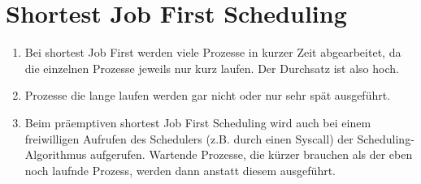 \documentclass[DIN, pagenumber=false, fontsize=11pt, parskip=half]{scrartcl}
\begin{document}
    \section{Shortest Job First Scheduling}
    \begin{enumerate}[label=(\alph*)]
        \item Bei shortest Job First werden viele Prozesse in kurzer Zeit abgearbeitet, da die einzelnen Prozesse jeweils nur kurz laufen. Der Durchsatz ist also hoch.
        \item Prozesse die lange laufen werden gar nicht oder nur sehr spät ausgeführt.
        \item Beim präemptiven shortest Job First Scheduling wird auch bei einem \glqq{}freiwilligen\grqq{} Aufrufen des Schedulers (z.B. durch einen Syscall) der Scheduling-Algorithmus aufgerufen. Wartende Prozesse, die kürzer brauchen als der eben noch laufnde Prozess, werden dann anstatt diesem ausgeführt.


\end{enumerate}
\end{document}
